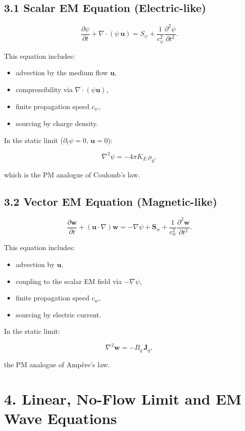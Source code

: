 \documentclass{article}
\begin{document}
\subsection*{3.1 Scalar EM Equation (Electric-like)}


\[
\frac{\partial \psi}{\partial t}
+ \nabla\cdot(\psi\,\mathbf u)
=
S_\psi
+
\frac{1}{c_\psi^2}\frac{\partial^2 \psi}{\partial t^2}.
\]


This equation includes:
\begin{itemize}
    \item advection by the medium flow $\mathbf u$,
    \item compressibility via $\nabla\cdot(\psi\mathbf u)$,
    \item finite propagation speed $c_\psi$,
    \item sourcing by charge density.
\end{itemize}

In the static limit ($\partial_t \psi = 0$, $\mathbf u = 0$):


\[
\nabla^2 \psi = -4\pi K_E\,\rho_q,
\]


which is the PM analogue of Coulomb's law.

\subsection*{3.2 Vector EM Equation (Magnetic-like)}


\[
\frac{\partial \mathbf w}{\partial t}
+ (\mathbf u\cdot\nabla)\mathbf w
=
-\nabla \psi
+ \mathbf S_w
+
\frac{1}{c_w^2}\frac{\partial^2 \mathbf w}{\partial t^2}.
\]


This equation includes:
\begin{itemize}
    \item advection by $\mathbf u$,
    \item coupling to the scalar EM field via $-\nabla\psi$,
    \item finite propagation speed $c_w$,
    \item sourcing by electric current.
\end{itemize}

In the static limit:


\[
\nabla^2 \mathbf w = -B_q\,\mathbf J_q,
\]


the PM analogue of Amp\`ere's law.

\section*{4. Linear, No-Flow Limit and EM Wave Equations}
\end{document}
